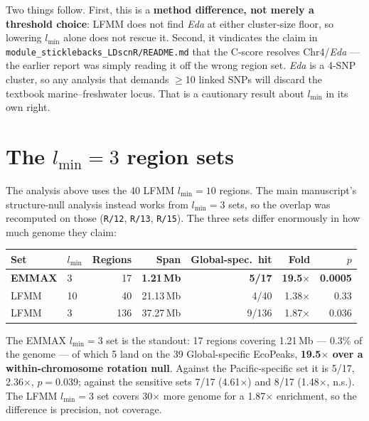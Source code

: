 \documentclass[11pt,a4paper]{article}
\newcommand{\gene}[1]{\textit{#1}}
\begin{document}
Two things follow. First, this is a \textbf{method difference, not merely a threshold
choice}: LFMM does not find \gene{Eda} at either cluster-size floor, so lowering
$l_{\min}$ alone does not rescue it. Second, it vindicates the claim in
\texttt{module\_sticklebacks\_LDscnR/README.md} that the C-score resolves Chr4/\gene{Eda}
--- the earlier report was simply reading it off the wrong region set. \gene{Eda} is a
4-SNP cluster, so any analysis that demands $\geq$10 linked SNPs will discard the textbook
marine--freshwater locus. That is a cautionary result about $l_{\min}$ in its own right.

\section{The $l_{\min}{=}3$ region sets}\label{sec:lmin3}

The analysis above uses the 40 LFMM $l_{\min}{=}10$ regions. The main manuscript's
structure-null analysis instead works from $l_{\min}{=}3$ sets, so the overlap was recomputed
on those (\texttt{R/12}, \texttt{R/13}, \texttt{R/15}). The three sets differ enormously in
how much genome they claim:

\begin{table}[h]\centering\small
\begin{tabular}{llrrrrr}\toprule
Set & $l_{\min}$ & Regions & Span & Global-spec.\ hit & Fold & $p$ \\ \midrule
\textbf{EMMAX} & 3  & 17  & \textbf{1.21\,Mb}  & \textbf{5/17}   & \textbf{19.5$\times$} & \textbf{0.0005} \\
LFMM           & 10 & 40  & 21.13\,Mb          & 4/40            & 1.38$\times$          & 0.33 \\
LFMM           & 3  & 136 & 37.27\,Mb          & 9/136           & 1.87$\times$          & 0.036 \\ \bottomrule
\end{tabular}
\end{table}

The EMMAX $l_{\min}{=}3$ set is the standout: 17 regions covering 1.21\,Mb --- 0.3\% of the
genome --- of which 5 land on the 39 Global-specific EcoPeaks, \textbf{19.5$\times$ over a
within-chromosome rotation null}. Against the Pacific-specific set it is 5/17,
2.36$\times$, $p = 0.039$; against the sensitive sets 7/17 (4.61$\times$) and 8/17
(1.48$\times$, n.s.). The LFMM $l_{\min}{=}3$ set covers 30$\times$ more genome for a
1.87$\times$ enrichment, so the difference is precision, not coverage.
\end{document}
